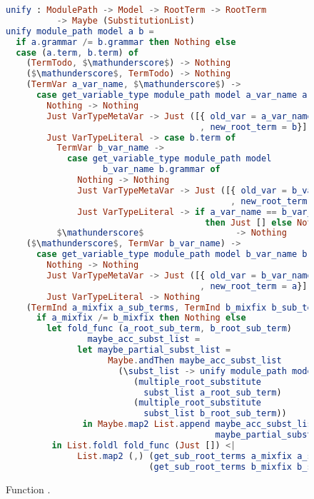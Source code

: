 \documentclass[master.tex]{subfiles}
\begin{document}
\begin{figure}[H]
\begin{framed}
\begin{lstlisting}[language=elm,basicstyle=\footnotesize\ttfamily]
unify : ModulePath -> Model -> RootTerm -> RootTerm
          -> Maybe (SubstitutionList)
unify module_path model a b =
  if a.grammar /= b.grammar then Nothing else
  case (a.term, b.term) of
    (TermTodo, $\mathunderscore$) -> Nothing
    ($\mathunderscore$, TermTodo) -> Nothing
    (TermVar a_var_name, $\mathunderscore$) ->
      case get_variable_type module_path model a_var_name a.grammar of
        Nothing -> Nothing
        Just VarTypeMetaVar -> Just ([{ old_var = a_var_name
                                      , new_root_term = b}])
        Just VarTypeLiteral -> case b.term of
          TermVar b_var_name ->
            case get_variable_type module_path model
                   b_var_name b.grammar of
              Nothing -> Nothing
              Just VarTypeMetaVar -> Just ([{ old_var = b_var_name
                                            , new_root_term = a}])
              Just VarTypeLiteral -> if a_var_name == b_var_name
                                       then Just [] else Nothing
          $\mathunderscore$                  -> Nothing
    ($\mathunderscore$, TermVar b_var_name) ->
      case get_variable_type module_path model b_var_name b.grammar of
        Nothing -> Nothing
        Just VarTypeMetaVar -> Just ([{ old_var = b_var_name
                                      , new_root_term = a}])
        Just VarTypeLiteral -> Nothing
    (TermInd a_mixfix a_sub_terms, TermInd b_mixfix b_sub_terms) ->
      if a_mixfix /= b_mixfix then Nothing else
        let fold_func (a_root_sub_term, b_root_sub_term)
                maybe_acc_subst_list =
              let maybe_partial_subst_list =
                    Maybe.andThen maybe_acc_subst_list
                      (\subst_list -> unify module_path model
                         (multiple_root_substitute
                           subst_list a_root_sub_term)
                         (multiple_root_substitute
                           subst_list b_root_sub_term))
               in Maybe.map2 List.append maybe_acc_subst_list
                                         maybe_partial_subst_list
         in List.foldl fold_func (Just []) <|
              List.map2 (,) (get_sub_root_terms a_mixfix a_sub_terms)
                            (get_sub_root_terms b_mixfix b_sub_terms)
\end{lstlisting}
\end{framed}
\caption{Function .}
\label{fig:supp-unify}
\end{figure}
\end{document}
